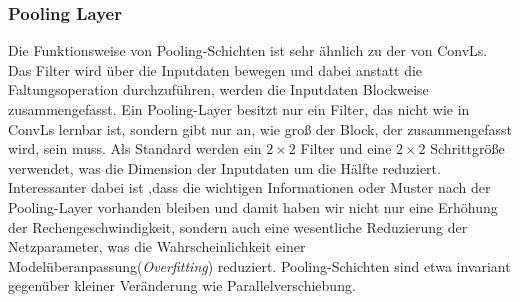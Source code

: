 \documentclass[12pt,a4paper]{scrartcl}
\numberwithin{equation}{section}
\begin{document}
\subsubsection{Pooling Layer}\label{Pooling Layer}
Die Funktionsweise von Pooling-Schichten ist sehr ähnlich zu der von \acsp{ConvL}. Das Filter wird über die Inputdaten bewegen und dabei anstatt die Faltungsoperation durchzuführen, werden die Inputdaten Blockweise zusammengefasst. Ein Pooling-Layer besitzt nur ein Filter, das nicht wie in \acsp{ConvL} lernbar ist, sondern gibt nur an, wie groß der Block, der zusammengefasst wird, sein muss.
Als Standard werden ein $ 2 \times 2 $ Filter und eine $ 2 \times 2 $ Schrittgröße verwendet, was die Dimension der Inputdaten um die Hälfte reduziert. Interessanter dabei ist ,dass die wichtigen Informationen oder Muster nach der Pooling-Layer vorhanden bleiben und damit haben wir nicht nur eine Erhöhung der Rechengeschwindigkeit, sondern auch eine wesentliche Reduzierung der Netzparameter, was die Wahrscheinlichkeit einer Modelüberanpassung(\textit{Overfitting}) reduziert. Pooling-Schichten sind etwa invariant gegenüber kleiner Veränderung wie Parallelverschiebung\cite{4}.
\end{document}
